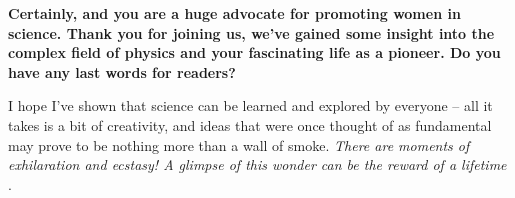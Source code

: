 \documentclass{article}
\newcommand{\q}[1]{\vspace{10pt}
\textbf{#1}
\vspace{0pt}}
\begin{document}
\begin{multicols}{2}
\q{Certainly, and you are a huge advocate for promoting women in science. Thank you for joining us, we’ve gained some insight into the complex field of physics and your fascinating life as a pioneer. Do you have any last words for readers?}

I hope I've shown that science can be learned and explored by everyone – all it takes is a bit of creativity, and ideas that were once thought of as fundamental may prove to be nothing more than a wall of smoke. \textit{There are moments of exhilaration and ecstasy! A glimpse of this wonder can be the reward of a lifetime} \cite{N10}.

\closearticle



\end{multicols}

\newpage


\end{document}
